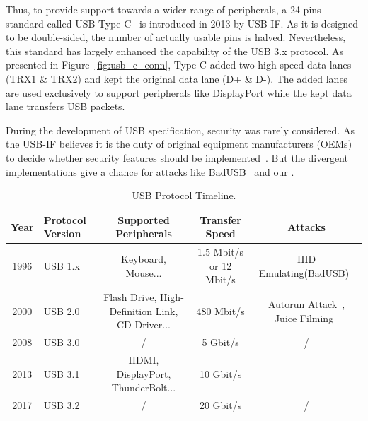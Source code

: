 Thus, to provide support towards a wider range of peripherals, a 24-pins
standard called USB Type-C~\cite{typec} is introduced in 2013 by USB-IF. As it is designed to be double-sided, the number of actually usable
pins is halved. Nevertheless, this standard has largely enhanced the capability
of the USB 3.x protocol. As presented in Figure~\ref{fig:usb_c_conn}, Type-C added
two high-speed data lanes (TRX1 \& TRX2) and kept the original data lane (D+ \&
D-). The added lanes are used exclusively to support peripherals like
DisplayPort while the kept data lane transfers USB packets.

During the development of USB specification, security was rarely considered. As
the USB-IF believes it is the duty of original equipment manufacturers (OEMs)
to decide whether security features should be implemented~\cite{usbsec}. But the divergent implementations give a chance for attacks like
BadUSB~\cite{rubber} and our \tool.

\begin{table}
\begin{tabular}{clccc}
	\hline
	\textbf{Year} & \textbf{Protocol Version} & \textbf{Supported Peripherals} & \textbf{Transfer Speed} & \textbf{Attacks} \\
	\hline
	1996 & USB 1.x~\cite{usb10,usb11} & Keyboard, Mouse... & 1.5 Mbit/s or 12 Mbit/s & HID Emulating(BadUSB)~\cite{badusb} \\
	2000 & USB 2.0~\cite{usb20} & Flash Drive, High-Definition Link, CD Driver... & 480 Mbit/s & Autorun Attack~\cite{duqu}, Juice Filming~\cite{JFC,JFCImpact} \\
	2008 & USB 3.0~\cite{usb30} & / & 5 Gbit/s & / \\
	2013 & USB 3.1~\cite{usb31} & HDMI, DisplayPort, ThunderBolt... & 10 Gbit/s & \tool \\
	2017 & USB 3.2~\cite{usb32} & / & 20 Gbit/s & / \\
	\hline
\end{tabular}
	\linebreak
\caption{USB Protocol Timeline.}
\label{table:usb_timeline}
\end{table}
